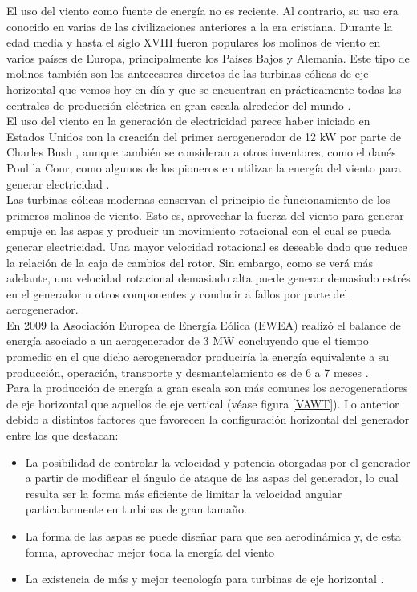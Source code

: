 {\parindent0pt El uso del viento como fuente de energía no es reciente. Al contrario, su uso
era conocido en varias de las civilizaciones anteriores a la era cristiana. Durante la edad 
media y hasta el siglo XVIII fueron populares los molinos de viento en varios países de Europa, 
principalmente los Países Bajos y Alemania. Este tipo de molinos también son los antecesores 
directos de las turbinas eólicas de eje horizontal que vemos hoy en día y que se encuentran en 
prácticamente todas las centrales de producción eléctrica en gran escala alrededor del mundo \cite{Hau2013}.
\\

El uso del viento en la generación de electricidad parece haber iniciado en Estados Unidos 
con la creación del primer aerogenerador de 12 kW por parte de Charles Bush \cite{Burton2011}, 
aunque también se consideran a otros inventores, como el danés Poul la Cour, como algunos de 
los pioneros en utilizar la energía del viento para generar electricidad \cite{Hansen2015}.
\\

Las turbinas eólicas modernas conservan el principio de funcionamiento de los primeros molinos 
de viento. Esto es, aprovechar la fuerza del viento para generar empuje en las aspas y producir 
un movimiento rotacional con el cual se pueda generar electricidad. Una mayor velocidad rotacional 
es deseable dado que reduce la relación de la caja de cambios del rotor. Sin embargo, como 
se verá más adelante, una velocidad rotacional demasiado alta puede generar demasiado estrés 
en el generador u otros componentes y conducir a fallos por parte del aerogenerador. 
\\

En 2009 la Asociación Europea de Energía Eólica (EWEA) realizó el balance de energía asociado 
a un aerogenerador de 3 MW concluyendo que el tiempo promedio en el que dicho aerogenerador 
produciría la energía equivalente a su producción, operación, transporte y desmantelamiento 
es de 6 a 7 meses \cite{Burton2011}.
\\

Para la producción de energía a gran escala son más comunes los aerogeneradores de eje 
horizontal que aquellos de eje vertical (véase figura \ref{VAWT}). Lo anterior debido a 
distintos factores que favorecen la configuración horizontal del generador entre los que destacan:

\begin{itemize}
\item La posibilidad de controlar la velocidad y potencia otorgadas por el generador a partir de 
modificar el ángulo de ataque de las aspas del generador, lo cual resulta ser la forma más 
eficiente de limitar la velocidad angular particularmente en turbinas de gran tamaño.
\item La forma de las aspas se puede diseñar para que sea aerodinámica y, de esta forma, 
aprovechar mejor toda la energía del viento
\item La existencia de más y mejor tecnología para turbinas de eje horizontal \cite{Hau2013}.
\end{itemize}

}
